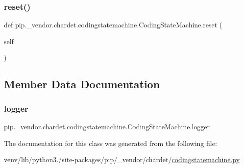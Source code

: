 \subsubsection{\texorpdfstring{reset()}{reset()}}
{\footnotesize\ttfamily def pip.\+\_\+vendor.\+chardet.\+codingstatemachine.\+Coding\+State\+Machine.\+reset (\begin{DoxyParamCaption}\item[{}]{self }\end{DoxyParamCaption})}



\subsection{Member Data Documentation}
\mbox{\label{classpip_1_1__vendor_1_1chardet_1_1codingstatemachine_1_1CodingStateMachine_afacacdb15e197d8a3ab4f73b9fd76354}} 
\subsubsection{\texorpdfstring{logger}{logger}}
{\footnotesize\ttfamily pip.\+\_\+vendor.\+chardet.\+codingstatemachine.\+Coding\+State\+Machine.\+logger}



The documentation for this class was generated from the following file\+:\begin{DoxyCompactItemize}
\item 
venv/lib/python3./site-\/packages/pip/\+\_\+vendor/chardet/\hyperlink{codingstatemachine_8py}{codingstatemachine.\+py}\end{DoxyCompactItemize}
